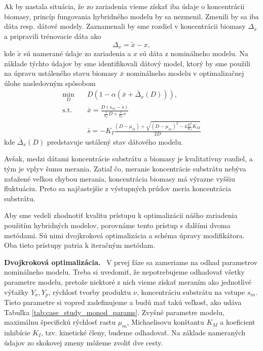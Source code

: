 Ak by nastala situácia, že zo zariadenia vieme získať iba údaje o koncentrácii biomasy, princíp fungovania hybridného modelu by sa nezmenil. Zmenili by sa iba dáta resp. dátové modely. Zaznamenali by sme rozdiel v koncentrácii biomasy $ \Delta_{x} $ a pripravili trénovacie dáta ako
\begin{equation}
	\Delta_{x} = \tilde{x} - x,
\end{equation} 
kde $ \tilde{x} $ sú namerané údaje zo zariadenia a $ x $ sú dáta z nominálneho modelu. Na základe týchto údajov by sme identifikovali dátový model, ktorý by sme použili na úpravu ustáleného stavu biomasy $ \bar{x} $ nominálneho modelu v optimalizačnej úlohe nasledovným spôsobom
\begin{equation}
\label{eq:hybrid_opt_bio}
	\begin{split}
		\min_{D} &\quad D\left(1-\alpha\left(\bar{x}+\bar{\Delta}_{x}(D)\right)\right), \\
		\text{s.t.} &\quad \bar{x} = \frac{D\left(s_{in}-\bar{s}\right)}{\frac{1}{Y_{x}}D + \frac{1}{Y_{x}}\nu} \\
		&\quad \bar{s} = -K_{I}\frac{\left(D-\mu_{m}\right) + \sqrt{\left(D-\mu_{m}\right)^2 - 4\frac{D^2}{K_{I}}K_{M}}}{2D}
	\end{split}
\end{equation}
kde $ \bar{\Delta}_{x}(D) $ predstavuje ustálený stav dátového modelu.

Avšak, medzi dátami koncentrácie substrátu a biomasy je kvalitatívny rozdiel, a tým je vplyv šumu merania. Zatiaľ čo, meranie koncentrácie substrátu nebýva zaťažené veľkou chybou merania, koncentrácia biomasy má výrazne vyššiu fluktuáciu. Preto sa najčastejšie z výstupných prúdov meria koncentrácia substrátu. 

Aby sme vedeli zhodnotiť kvalitu prístupu k optimalizácii nášho zariadenia použitím hybridných modelov, porovnáme tento prístup s ďalšími dvoma metódami. Sú nimi dvojkroková optimalizácia a schéma úpravy modifikátora. Oba tieto prístupy patria k iteračným metódam.

\textbf{Dvojkroková optimalizácia.}\
V prvej fáze sa zameriame na odhad parametrov nominálneho modelu. Treba si uvedomiť, že nepotrebujeme odhadovať všetky parametre modelu, pretože niektoré z nich vieme získať meraním ako jednotlivé výťažky $ Y_{x}, Y_{p} $, rýchlosť tvorby produktu $ \nu $, koncentráciu substrátu na vstupe $ s_{in} $. Tieto parametre si vopred zadefinujeme a budú mať takú veľkosť, ako udáva Tabuľka \ref{tab:case_study_monod_params}. Zvyšné parametre modelu, maximálnu špecifickú rýchlosť rastu $ \mu_{m} $, Michaelisovu konštantu $ K_{M} $ a koeficient inhibície $ K_{I} $, tzv. kinetické členy, budeme odhadovať. Na základe nameraných údajov zo skokovej zmeny môžeme zvoliť dve cesty.

